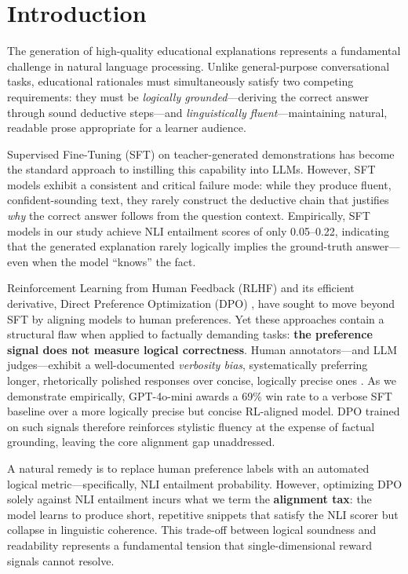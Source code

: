 \section{Introduction}

The generation of high-quality educational explanations represents a fundamental challenge in natural language processing. Unlike general-purpose conversational tasks, educational rationales must simultaneously satisfy two competing requirements: they must be \textit{logically grounded}---deriving the correct answer through sound deductive steps---and \textit{linguistically fluent}---maintaining natural, readable prose appropriate for a learner audience.

Supervised Fine-Tuning (SFT) on teacher-generated demonstrations has become the standard approach to instilling this capability into LLMs. However, SFT models exhibit a consistent and critical failure mode: while they produce fluent, confident-sounding text, they rarely construct the deductive chain that justifies \textit{why} the correct answer follows from the question context. Empirically, SFT models in our study achieve NLI entailment scores of only 0.05--0.22, indicating that the generated explanation rarely logically implies the ground-truth answer---even when the model ``knows'' the fact.

Reinforcement Learning from Human Feedback (RLHF) and its efficient derivative, Direct Preference Optimization (DPO) \cite{rafailov2023direct}, have sought to move beyond SFT by aligning models to human preferences. Yet these approaches contain a structural flaw when applied to factually demanding tasks: \textbf{the preference signal does not measure logical correctness}. Human annotators---and LLM judges---exhibit a well-documented \textit{verbosity bias}, systematically preferring longer, rhetorically polished responses over concise, logically precise ones \cite{zheng2023judging}. As we demonstrate empirically, GPT-4o-mini awards a 69\% win rate to a verbose SFT baseline over a more logically precise but concise RL-aligned model. DPO trained on such signals therefore reinforces stylistic fluency at the expense of factual grounding, leaving the core alignment gap unaddressed.

A natural remedy is to replace human preference labels with an automated logical metric---specifically, NLI entailment probability. However, optimizing DPO solely against NLI entailment incurs what we term the \textbf{alignment tax}: the model learns to produce short, repetitive snippets that satisfy the NLI scorer but collapse in linguistic coherence. This trade-off between logical soundness and readability represents a fundamental tension that single-dimensional reward signals cannot resolve.

